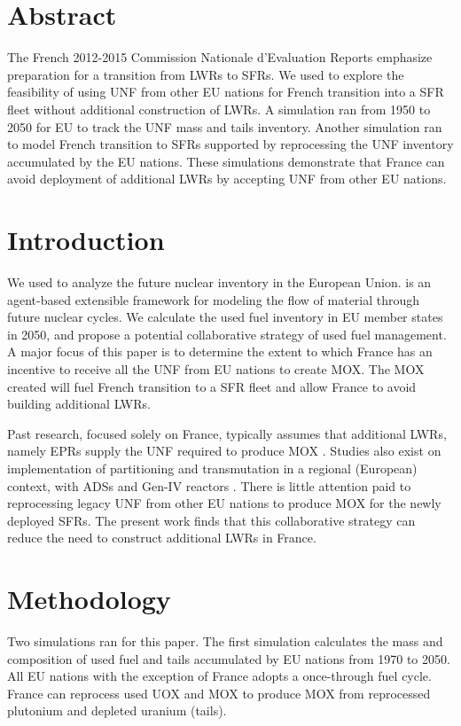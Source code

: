 \section{Abstract}
The French 2012-2015 Commission Nationale d'Evaluation Reports
\cite{cne2_reports_2015} emphasize preparation for a transition from \glspl{LWR} to \glspl{SFR}.
We used \Cyclus \cite{huff_fundamental_2016} to explore the feasibility of using \gls{UNF} from other EU nations
for French transition into a \gls{SFR} fleet without additional construction of \glspl{LWR}.
A \Cyclus simulation ran from 1950 to 2050 for EU to track the \gls{UNF} mass
and tails inventory. Another simulation ran to model French
transition to \glspl{SFR} supported by reprocessing the \gls{UNF} inventory accumulated by the \gls{EU} nations.
These simulations demonstrate that France can avoid deployment
of additional \glspl{LWR} by accepting \gls{UNF} from other EU nations.


\section{Introduction}
We used \Cyclus to analyze
the future nuclear inventory in the European Union. \Cyclus is an agent-based extensible
framework for modeling the flow of material through future nuclear cycles.
We calculate the used fuel
inventory in \gls{EU} member states in 2050, and propose a potential collaborative strategy of used fuel
management.
A major focus of this paper is to determine the extent to which France has an incentive
to receive all the \gls{UNF} from \gls{EU} nations to create \gls{MOX}.
The \gls{MOX} created will fuel French transition to a \gls{SFR} fleet
and allow France to avoid building additional \glspl{LWR}.

Past research, focused solely on France, typically assumes that additional \glspl{LWR},
namely \glspl{EPR} supply the \gls{UNF} required to produce \gls{MOX} \cite{carre_overview_2009, martin_symbiotic_2017, freynet_multiobjective_2016}.
Studies also exist on implementation of partitioning and transmutation
in a regional (European) context, with \glspl{ADS} and Gen-IV reactors \cite{fazio_study_2013}.
There is little attention paid to reprocessing legacy \gls{UNF} from other
EU nations to produce \gls{MOX} for the newly deployed \glspl{SFR}.
The present work finds that this collaborative strategy can reduce the
need to construct additional \glspl{LWR} in France.

\section{Methodology}
Two \Cyclus simulations ran for this paper. 
The first simulation calculates
the mass and composition of used fuel and tails accumulated by \gls{EU} nations from 1970 to 2050.
All EU nations with the exception of France adopts a once-through fuel cycle.
France can reprocess used \gls{UOX} and \gls{MOX} to
produce \gls{MOX} from reprocessed plutonium and depleted uranium (tails).

